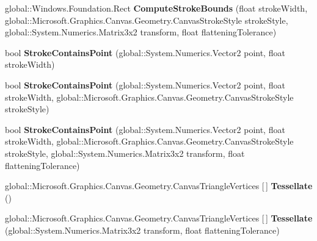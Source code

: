 \begin{DoxyCompactItemize}
global\+::\+Windows.\+Foundation.\+Rect {\bfseries Compute\+Stroke\+Bounds} (float stroke\+Width, global\+::\+Microsoft.\+Graphics.\+Canvas.\+Geometry.\+Canvas\+Stroke\+Style stroke\+Style, global\+::\+System.\+Numerics.\+Matrix3x2 transform, float flattening\+Tolerance)
\item 
\mbox{\label{interface_microsoft_1_1_graphics_1_1_canvas_1_1_geometry_1_1_i_canvas_geometry_acdb5842e23cf49f65d75966833fcdeda}} 
bool {\bfseries Stroke\+Contains\+Point} (global\+::\+System.\+Numerics.\+Vector2 point, float stroke\+Width)
\item 
\mbox{\label{interface_microsoft_1_1_graphics_1_1_canvas_1_1_geometry_1_1_i_canvas_geometry_a749861cc7df09da3d826703f624d3aa2}} 
bool {\bfseries Stroke\+Contains\+Point} (global\+::\+System.\+Numerics.\+Vector2 point, float stroke\+Width, global\+::\+Microsoft.\+Graphics.\+Canvas.\+Geometry.\+Canvas\+Stroke\+Style stroke\+Style)
\item 
\mbox{\label{interface_microsoft_1_1_graphics_1_1_canvas_1_1_geometry_1_1_i_canvas_geometry_a8c8e0234f10f24e16c5e23af24012c5a}} 
bool {\bfseries Stroke\+Contains\+Point} (global\+::\+System.\+Numerics.\+Vector2 point, float stroke\+Width, global\+::\+Microsoft.\+Graphics.\+Canvas.\+Geometry.\+Canvas\+Stroke\+Style stroke\+Style, global\+::\+System.\+Numerics.\+Matrix3x2 transform, float flattening\+Tolerance)
\item 
\mbox{\label{interface_microsoft_1_1_graphics_1_1_canvas_1_1_geometry_1_1_i_canvas_geometry_a3dc1c0c2642c9d24d0f9bae6c3181968}} 
global\+::\+Microsoft.\+Graphics.\+Canvas.\+Geometry.\+Canvas\+Triangle\+Vertices \mbox{[}$\,$\mbox{]} {\bfseries Tessellate} ()
\item 
\mbox{\label{interface_microsoft_1_1_graphics_1_1_canvas_1_1_geometry_1_1_i_canvas_geometry_a2f5903941962961821c79b2142291f25}} 
global\+::\+Microsoft.\+Graphics.\+Canvas.\+Geometry.\+Canvas\+Triangle\+Vertices \mbox{[}$\,$\mbox{]} {\bfseries Tessellate} (global\+::\+System.\+Numerics.\+Matrix3x2 transform, float flattening\+Tolerance)

\end{DoxyCompactItemize}
